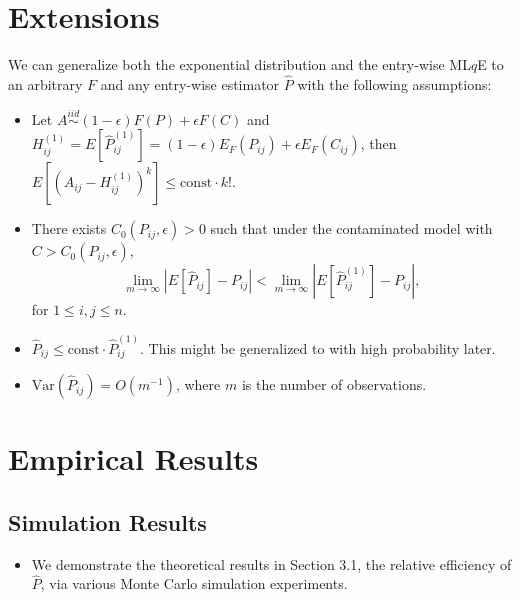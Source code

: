 \documentclass[a4paper]{article}
\begin{document}
\section{Extensions}
\label{section:extension}
We can generalize both the exponential distribution and the entry-wise ML$q$E to an arbitrary $F$ and any entry-wise estimator $\hat{P}$ with the following assumptions:
\begin{itemize}
\item Let $A \stackrel{iid}{\sim} (1-\epsilon) F(P) + \epsilon F(C) $ and $H_{ij}^{(1)} = E[\hat{P}_{ij}^{(1)}] = (1-\epsilon) E_F(P_{ij}) + \epsilon E_F(C_{ij})$, then $E[(A_{ij} - H_{ij}^{(1)})^k] \le \mathrm{const} \cdot k!$.
\item There exists $C_0(P_{ij}, \epsilon) > 0$ such that under the contaminated model with $C > C_0(P_{ij}, \epsilon)$,
\[
	\lim_{m \to \infty} \left| E[\hat{P}_{ij}] - P_{ij} \right| < 
    \lim_{m \to \infty} \left| E[\hat{P}^{(1)}_{ij}] - P_{ij} \right|,
\]
for $1 \le i, j \le n$.
\item $\hat{P}_{ij} \le \mathrm{const} \cdot \hat{P}_{ij}^{(1)}$. This might be generalized to with high probability later.
\item $\mathrm{Var}(\hat{P}_{ij}) = O(m^{-1})$, where $m$ is the number of observations.
\end{itemize}

\section{Empirical Results}

\subsection{Simulation Results}

\begin{itemize}
\item We demonstrate the theoretical results in Section 3.1, the relative efficiency of $\hat{P}$, via various Monte Carlo simulation experiments.
\end{itemize}
\end{document}

